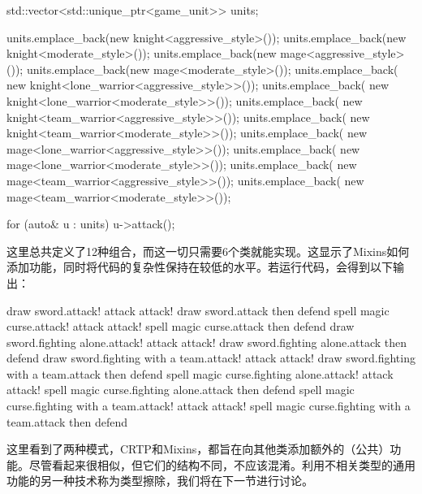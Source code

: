 \begin{cpp}
std::vector<std::unique_ptr<game_unit>> units;

units.emplace_back(new knight<aggressive_style>());
units.emplace_back(new knight<moderate_style>());
units.emplace_back(new mage<aggressive_style>());
units.emplace_back(new mage<moderate_style>());
units.emplace_back(
	new knight<lone_warrior<aggressive_style>>());
units.emplace_back(
	new knight<lone_warrior<moderate_style>>());
units.emplace_back(
	new knight<team_warrior<aggressive_style>>());
units.emplace_back(
	new knight<team_warrior<moderate_style>>());
units.emplace_back(
	new mage<lone_warrior<aggressive_style>>());
units.emplace_back(
	new mage<lone_warrior<moderate_style>>());
units.emplace_back(
	new mage<team_warrior<aggressive_style>>());
units.emplace_back(
	new mage<team_warrior<moderate_style>>());

for (auto& u : units)
	u->attack();
\end{cpp}

这里总共定义了12种组合，而这一切只需要6个类就能实现。这显示了Mixins如何添加功能，同时将代码的复杂性保持在较低的水平。若运行代码，会得到以下输出：

\begin{shell}
draw sword.attack! attack attack!
draw sword.attack then defend
spell magic curse.attack! attack attack!
spell magic curse.attack then defend
draw sword.fighting alone.attack! attack attack!
draw sword.fighting alone.attack then defend
draw sword.fighting with a team.attack! attack attack!
draw sword.fighting with a team.attack then defend
spell magic curse.fighting alone.attack! attack attack!
spell magic curse.fighting alone.attack then defend
spell magic curse.fighting with a team.attack! attack attack!
spell magic curse.fighting with a team.attack then defend
\end{shell}

这里看到了两种模式，CRTP和Mixins，都旨在向其他类添加额外的（公共）功能。尽管看起来很相似，但它们的结构不同，不应该混淆。利用不相关类型的通用功能的另一种技术称为类型擦除，我们将在下一节进行讨论。



































